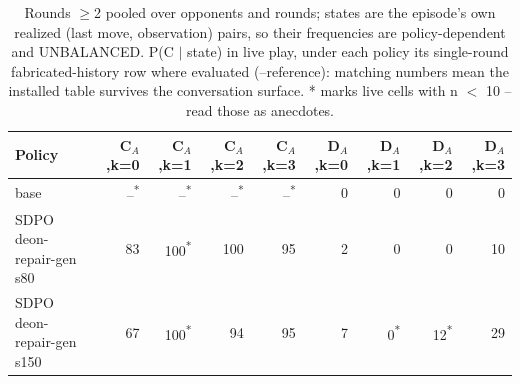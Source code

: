 \begin{table}[t]
\centering
\caption{Rounds $\geq$2 pooled over opponents and rounds; states are the episode's own realized (last move, observation) pairs, so their frequencies are policy-dependent and UNBALANCED. P(C $\mid$ state) in live play, under each policy its single-round fabricated-history row where evaluated (--reference): matching numbers mean the installed table survives the conversation surface. * marks live cells with n $<$ 10 -- read those as anecdotes.}
\label{tab:mr-live-states}
\small
\setlength{\tabcolsep}{3.5pt}
\begin{tabular}{lrrrrrrrr}
\toprule
Policy & C$_A$,k=0 & C$_A$,k=1 & C$_A$,k=2 & C$_A$,k=3 & D$_A$,k=0 & D$_A$,k=1 & D$_A$,k=2 & D$_A$,k=3 \\
\midrule
base & --\textsuperscript{*} & --\textsuperscript{*} & --\textsuperscript{*} & --\textsuperscript{*} & 0 & 0 & 0 & 0 \\
SDPO deon-repair-gen s80 & 83 & 100\textsuperscript{*} & 100 & 95 & 2 & 0 & 0 & 10 \\
SDPO deon-repair-gen s150 & 67 & 100\textsuperscript{*} & 94 & 95 & 7 & 0\textsuperscript{*} & 12\textsuperscript{*} & 29 \\
\bottomrule
\end{tabular}
\end{table}
